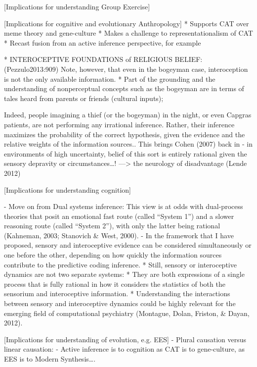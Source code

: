[Implications for understanding Group Exercise]


[Implications for cognitive and evolutionary Anthropology]
      * Supports CAT over meme theory and gene-culture
          * Makes a challenge to representationalism of CAT
      * Recast fusion from an active inference perspective, for example


      * INTEROCEPTIVE FOUNDATIONS of RELIGIOUS BELIEF: (Pezzulo2013:909)
      Note, however, that even in the bogeyman case, interoception is not the only available information.
          * Part of the grounding and the understanding of nonperceptual concepts such as the bogeyman are in terms of tales heard from parents or friends (cultural inputs);

          Indeed, people imagining a thief (or the bogeyman) in the night, or even Capgras patients, are not performing any irrational inference. Rather, their inference maximizes the probability of the correct hypothesis, given the evidence and the relative weights of the information sources..
    This brings Cohen (2007) back in - in environments of high uncertainty, belief of this sort is entirely rational given the sensory depravity or circumstances…!
—> the neurology of disadvantage (Lende 2012)


[Implications for understanding cognition]

  - Move on from Dual systems inference:
      This view is at odds with dual-process theories that posit an emotional fast route (called “System 1”) and a slower reasoning route (called “System 2”), with only the latter being rational (Kahneman, 2003; Stanovich & West, 2000).
      - In the framework that I have proposed, sensory and interoceptive evidence can be considered simultaneously or one before the other, depending on how quickly the information sources contribute to the predictive coding inference.
      * Still, sensory or interoceptive dynamics are not two separate systems:
          * They are both expressions of a single process that is fully rational in how it considers the statistics of both the sensorium and interoceptive information.
          * Understanding the interactions between sensory and interoceptive dynamics could be highly relevant for the emerging field of computational psychiatry (Montague, Dolan, Friston, & Dayan, 2012).

[Implications for understanding of evolution, e.g. EES]
    - Plural causation versus linear causation:
    - Active inference is to cognition as CAT is to gene-culture, as EES is to Modern Synthesis….


